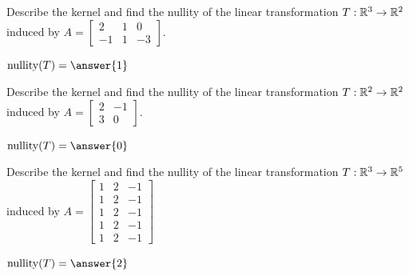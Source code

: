 \documentclass{ximera}
\begin{document}
\begin{problem}\label{prob:kerandnullityT1} Describe the kernel and find the nullity of the linear transformation 
$T:\mathbb{R}^3\rightarrow \mathbb{R}^2$ induced by $A=\begin{bmatrix}2&1&0\\-1&1&-3\end{bmatrix}$.

\begin{multipleChoice}
\end{multipleChoice}

$\mbox{nullity}(T)=\answer{1}$
\end{problem}

\begin{problem}\label{prob:kerandnullityT2} Describe the kernel and find the nullity of the linear transformation 
$T:\mathbb{R}^2\rightarrow \mathbb{R}^2$ induced by $A=\begin{bmatrix}2&-1\\3&0\end{bmatrix}$.

\begin{multipleChoice}
\end{multipleChoice}

$\mbox{nullity}(T)=\answer{0}$
\end{problem}

\begin{problem}\label{prob:kerandnullityT3} Describe the kernel and find the nullity of the linear transformation 
$T:\mathbb{R}^3\rightarrow \mathbb{R}^5$ induced by $A=\begin{bmatrix}1&2&-1\\1&2&-1\\1&2&-1\\1&2&-1\\1&2&-1\end{bmatrix}$ 

\begin{multipleChoice}
  
\end{multipleChoice}

$\mbox{nullity}(T)=\answer{2}$
\end{problem}
\end{document}
